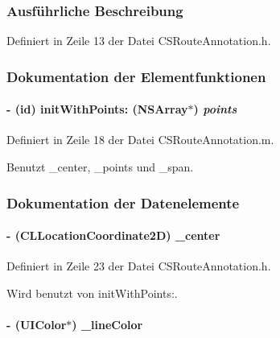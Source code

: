 \subsubsection{Ausführliche Beschreibung}


Definiert in Zeile 13 der Datei CSRouteAnnotation.h.

\subsubsection{Dokumentation der Elementfunktionen}
\hypertarget{interface_c_s_route_annotation_a8be047ba5640ddb7d10eb9b24c8a10a4}{
\paragraph[{initWithPoints:}]{\setlength{\rightskip}{0pt plus 5cm}-\/ (id) initWithPoints: (NSArray$\ast$) {\em points}}\hfill}
\label{interface_c_s_route_annotation_a8be047ba5640ddb7d10eb9b24c8a10a4}


Definiert in Zeile 18 der Datei CSRouteAnnotation.m.

Benutzt \_\-center, \_\-points und \_\-span.

\subsubsection{Dokumentation der Datenelemente}
\hypertarget{interface_c_s_route_annotation_aa799ff3d0f0b78f4c58870120fa4e4ac}{
\paragraph[{\_\-center}]{\setlength{\rightskip}{0pt plus 5cm}-\/ (CLLocationCoordinate2D) {\bf \_\-center}}\hfill}
\label{interface_c_s_route_annotation_aa799ff3d0f0b78f4c58870120fa4e4ac}


Definiert in Zeile 23 der Datei CSRouteAnnotation.h.

Wird benutzt von initWithPoints:.\hypertarget{interface_c_s_route_annotation_a84a2b7a56cb528ac237f11812f65b39b}{
\paragraph[{\_\-lineColor}]{\setlength{\rightskip}{0pt plus 5cm}-\/ (UIColor$\ast$) {\bf \_\-lineColor}}\hfill}
\label{interface_c_s_route_annotation_a84a2b7a56cb528ac237f11812f65b39b}


